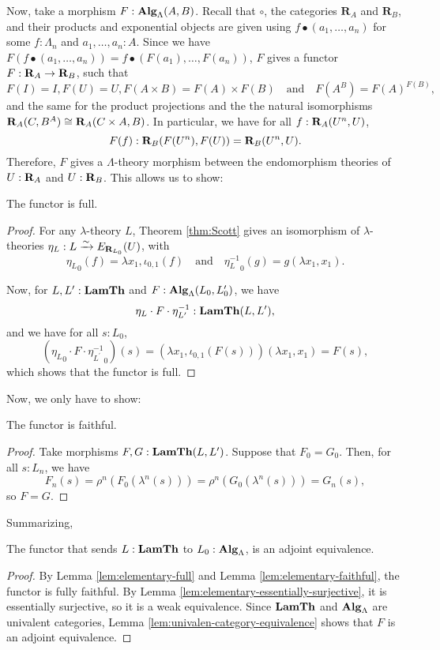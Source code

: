 Now, take a morphism $ F: \mathbf{Alg}_{\Lambda}(A, B) $. Recall that $ \circ $, the categories $ \mathbf R_A $ and $ \mathbf R_B $, and their products and exponential objects are given using $ f \bullet (a_1, \dots, a_n) $ for some $ f: \Lambda_n $ and $ a_1, \dots, a_n : A $. Since we have $ F(f \bullet (a_1, \dots, a_n)) = f \bullet (F(a_1), \dots, F(a_n)) $, $ F $ gives a functor $ F: \mathbf{R}_A \to \mathbf{R}_B $, such that
\[ F(I) = I, F(U) = U, F(A \times B) = F(A) \times F(B) \quad \text{and} \quad F(A^B) = F(A)^{F(B)}, \]
and the same for the product projections and the the natural isomorphisms $ \mathbf{R}_A(C, B^A) \cong \mathbf{R}_A(C \times A, B) $. In particular, we have for all $ f: \mathbf{R}_A(U^n, U) $,
\[ F(f) : \mathbf{R}_B(F(U^n), F(U)) = \mathbf{R}_B(U^n, U). \]
Therefore, $ F $ gives a $ \Lambda $-theory morphism between the endomorphism theories of $ U: \mathbf{R}_A $ and $ U: \mathbf{R}_B $. This allows us to show:
\begin{lemma}\label{lem:elementary-full}
  The functor is full.
\end{lemma}
\begin{proof}
  For any $ \lambda $-theory $ L $, Theorem \ref{thm:Scott} gives an isomorphism of $ \lambda $-theories $ \eta_L: L \xrightarrow \sim E_{\mathbf{R}_{L_0}}(U) $, with
  \[ {\eta_L}_0(f) = \lambda x_1, \iota_{0, 1}(f) \quad \text{and} \quad {\eta_L^{-1}}_0(g) = g(\lambda x_1, x_1). \]

  Now, for $ L, L^\prime: \mathbf{LamTh} $ and $ F: \mathbf{Alg}_{\Lambda}(L_0, L^\prime_0) $, we have
  \[ \eta_L \cdot F \cdot \eta_{L^\prime}^{-1} : \mathbf{LamTh}(L, L^\prime), \]
  and we have for all $ s : L_0 $,
  \[ ({\eta_L}_0 \cdot F \cdot {\eta_{L^\prime}^{-1}}_0)(s) = (\lambda x_1, \iota_{0, 1}(F(s))) (\lambda x_1, x_1) = F(s), \]
  which shows that the functor is full.
\end{proof}

Now, we only have to show:
\begin{lemma}\label{lem:elementary-faithful}
  The functor is faithful.
\end{lemma}
\begin{proof}
  Take morphisms $ F, G: \mathbf{LamTh}(L, L^\prime) $. Suppose that $ F_0 = G_0 $. Then, for all $ s: L_n $, we have
  \[ F_n(s) = \rho^n(F_0(\lambda^n(s))) = \rho^n(G_0(\lambda^n(s))) = G_n(s), \]
  so $ F = G $.
\end{proof}

Summarizing,
\begin{theorem}
  The functor that sends $ L : \mathbf{LamTh} $ to $ L_0 : \mathbf{Alg}_{\Lambda} $, is an adjoint equivalence.
\end{theorem}
\begin{proof}
  By Lemma \ref{lem:elementary-full} and Lemma \ref{lem:elementary-faithful}, the functor is fully faithful. By Lemma \ref{lem:elementary-essentially-surjective}, it is essentially surjective, so it is a weak equivalence. Since $ \mathbf{LamTh} $ and $ \mathbf{Alg}_{\Lambda} $ are univalent categories, Lemma \ref{lem:univalen-category-equivalence} shows that $ F $ is an adjoint equivalence.
\end{proof}

